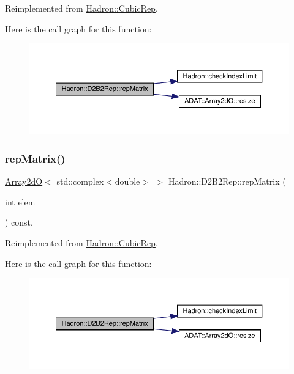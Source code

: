 Reimplemented from \mbox{\hyperlink{structHadron_1_1CubicRep_ac5d7e9e6f4ab1158b5fce3e4ad9e8005}{Hadron\+::\+Cubic\+Rep}}.

Here is the call graph for this function\+:
\nopagebreak
\begin{figure}[H]
\begin{center}
\leavevmode
\includegraphics[width=350pt]{d3/dbb/structHadron_1_1D2B2Rep_a0e46bb79c1d9429a207f9f82eef59450_cgraph}
\end{center}
\end{figure}
\mbox{\label{structHadron_1_1D2B2Rep_a0e46bb79c1d9429a207f9f82eef59450}} 
\subsubsection{\texorpdfstring{repMatrix()}{repMatrix()}\hspace{0.1cm}{\footnotesize\ttfamily [3/3]}}
{\footnotesize\ttfamily \mbox{\hyperlink{classADAT_1_1Array2dO}{Array2dO}}$<$ std\+::complex$<$double$>$ $>$ Hadron\+::\+D2\+B2\+Rep\+::rep\+Matrix (\begin{DoxyParamCaption}\item[{int}]{elem }\end{DoxyParamCaption}) const\hspace{0.3cm}{\ttfamily [inline]}, {\ttfamily [virtual]}}



Reimplemented from \mbox{\hyperlink{structHadron_1_1CubicRep_ac5d7e9e6f4ab1158b5fce3e4ad9e8005}{Hadron\+::\+Cubic\+Rep}}.

Here is the call graph for this function\+:
\nopagebreak
\begin{figure}[H]
\begin{center}
\leavevmode
\includegraphics[width=350pt]{d3/dbb/structHadron_1_1D2B2Rep_a0e46bb79c1d9429a207f9f82eef59450_cgraph}
\end{center}
\end{figure}


